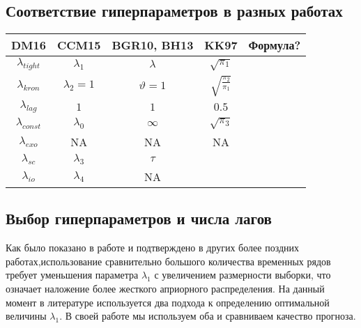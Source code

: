 \documentclass[11pt]{article} %
\begin{document}
\subsection{Соответствие гиперпараметров в разных работах}


\begin{center}
\begin{tabular}{ccccc}
\toprule
DM16 &  CCM15 &  BGR10, BH13 & KK97 &Формула? \\
\midrule
$\lambda_{tight}$ & $\lambda_1$ & $\lambda$ & $\sqrt{\pi_1}$ &\\
$\lambda_{kron}$ & $\lambda_2=1$ & $\vartheta=1$ &  $\sqrt{\frac{\pi_2}{\pi_1}}$&\\
$\lambda_{lag}$ & $1$ & $1$ & $0.5$&\\
$\lambda_{const}$  & $\lambda_0$ & $\infty$ &$ \sqrt{\pi_3}$& \\
$\lambda_{exo}$ & NA & NA & NA&\\
\midrule
$\lambda_{sc}$ & $\lambda_3$ & $\tau$ && \\
$\lambda_{io}$ & $\lambda_4$ & NA && \\
\bottomrule
\end{tabular}
\end{center}




\subsection{Выбор гиперпараметров и числа лагов}

Как было показано в работе \cite{demol_al_2008_forecasting} и подтверждено в других более поздних работах,использование сравнительно большого количества временных рядов требует уменьшения параметра $\lambda_1$ с увеличением размерности выборки, что означает наложение более жесткого априорного распределения. На данный момент в литературе используется два подхода к определению оптимальной величины $\lambda_1$. В своей работе мы используем оба и сравниваем качество прогноза.
\end{document}
